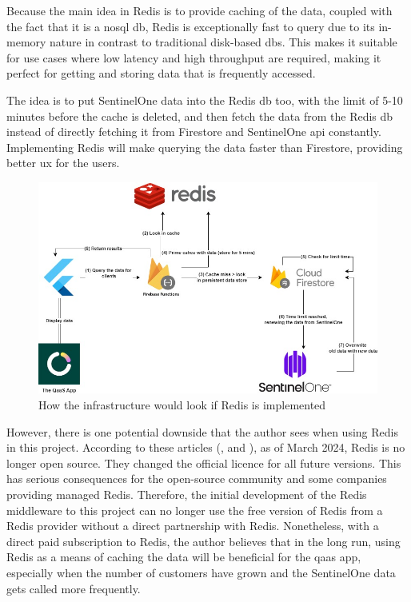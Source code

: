 Because the main idea in Redis is to provide caching of the data, coupled with the fact that it is a \acrshort{nosql} \acrshort{db},
Redis is exceptionally fast to query due to its in-memory nature in contrast to traditional disk-based \acrshort{db}s. This makes it
suitable for use cases where low latency and high throughput are required, making it perfect for getting and storing data that is
frequently accessed.

The idea is to put SentinelOne data into the Redis \acrshort{db} too, with the limit of 5-10 minutes before the cache is deleted,
and then fetch the data from the Redis \acrshort{db} instead of directly fetching it from Firestore and SentinelOne \acrshort{api}
constantly. Implementing Redis will make querying the data faster than Firestore, providing better \acrshort{ux} for the users.

\begin{figure}[H]
      \centering
      \includegraphics[width=1.0\textwidth]{Figures/Redis Caching.jpg}
      \caption{How the infrastructure would look if Redis is implemented}
\end{figure}

However, there is one potential downside that the author sees when using Redis in this project. According to these articles
(\textit{\cite{redisIsNoLongerFree}}, and \textit{\cite{redisMomento}}), as of March 2024, Redis is no  longer open source. They
changed the official licence for all future versions. This has serious consequences for the open-source community and some companies
providing managed Redis. Therefore, the initial development of the Redis middleware to this project can no longer use the free version
of Redis from a Redis provider without a direct partnership with Redis. Nonetheless, with a direct paid subscription to Redis, the
author believes that in the long run, using Redis as a means of caching the data will be beneficial for the \acrshort{qaas} app,
especially when the number of customers have grown and the SentinelOne data gets called more frequently.

